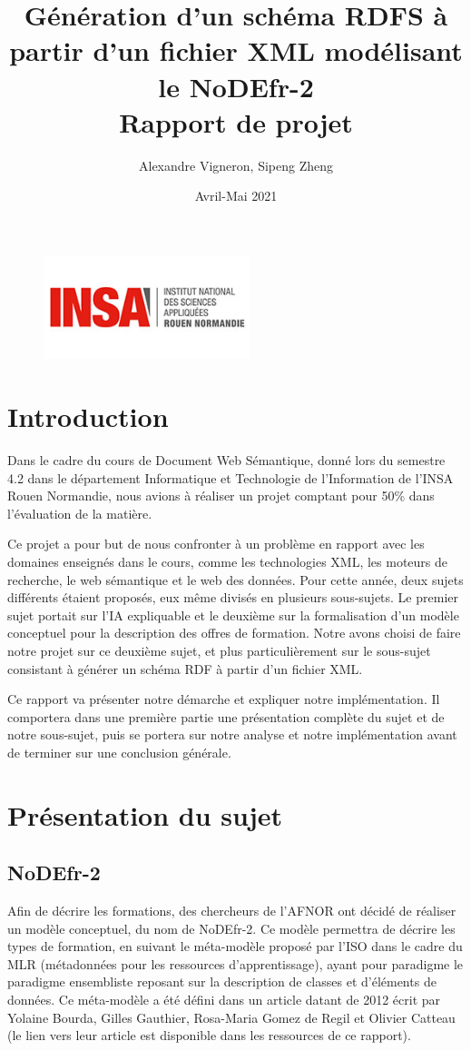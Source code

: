 \documentclass{article}
\title{Génération d'un schéma RDFS à partir d'un fichier XML modélisant le NoDEfr-2\\Rapport de projet}
\author{Alexandre Vigneron, Sipeng Zheng}
\date{Avril-Mai 2021}
\begin{document}
\maketitle
\begin{figure}[!ht]
    \center
    \includegraphics[width=6cm, height=3cm]{img/logo}
\end{figure}
\tableofcontents
\newpage

\section{Introduction}
Dans le cadre du cours de Document Web Sémantique, donné lors du semestre 4.2 dans le département Informatique et Technologie de l'Information de l'INSA Rouen Normandie, nous avions à réaliser un projet comptant pour 50\% dans l'évaluation de la matière. 

Ce projet a pour but de nous confronter à un problème en rapport avec les domaines enseignés dans le cours, comme les technologies XML, les moteurs de recherche, le web sémantique et le web des données.
Pour cette année, deux sujets différents étaient proposés, eux même divisés en plusieurs sous-sujets. Le premier sujet portait sur l'IA expliquable et le deuxième sur la formalisation d'un modèle conceptuel pour la description des offres de formation. Notre avons choisi de faire notre projet sur ce deuxième sujet, et plus particulièrement sur le sous-sujet consistant à générer un schéma RDF à partir d'un fichier XML.

Ce rapport va présenter notre démarche et expliquer notre implémentation. Il comportera dans une première partie une présentation complète du sujet et de notre sous-sujet, puis se portera sur notre analyse et notre implémentation avant de terminer sur une conclusion générale.

\section{Présentation du sujet}
\subsection{NoDEfr-2}
Afin de décrire les formations, des chercheurs de l'AFNOR ont décidé de réaliser un modèle conceptuel, du nom de NoDEfr-2. Ce modèle permettra de décrire les types de formation, en suivant le méta-modèle proposé par l'ISO dans le cadre du MLR (métadonnées pour les ressources d'apprentissage), ayant pour paradigme le paradigme ensembliste reposant sur la description de classes et d'éléments de données. Ce méta-modèle a été défini dans un article datant de 2012 écrit par Yolaine Bourda, Gilles Gauthier, Rosa-Maria Gomez de Regil et Olivier Catteau (le lien vers leur article est disponible dans les ressources de ce rapport).\\
\end{document}
